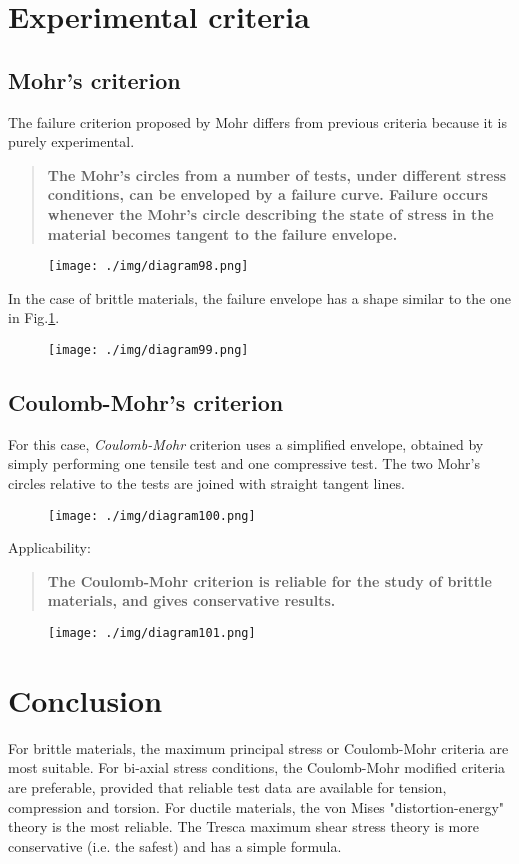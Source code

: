 \section{Experimental criteria}
\subsection{Mohr's criterion}
The failure criterion proposed by Mohr differs from previous criteria because it is purely experimental.
\begin{quotation}
  \textbf{The Mohr's circles from a number of tests, under different stress conditions, can be enveloped by a failure curve. Failure occurs whenever the Mohr's circle describing the state of stress in the material becomes tangent to the failure envelope.}
\end{quotation}
\begin{figure}[H]
  \centering
  \texttt{[image: ./img/diagram98.png]}
  \caption{}
\end{figure}
In the case of brittle materials, the failure envelope has a shape similar to the one in Fig.\ref{mohrscriterion1}.
\begin{figure}[H]
  \centering
  \texttt{[image: ./img/diagram99.png]}
  \caption{}
  \label{mohrscriterion1}
\end{figure}
\subsection{Coulomb-Mohr's criterion}
For this case, \textit{Coulomb-Mohr} criterion uses a simplified envelope, obtained by simply performing one tensile test and one compressive test. The two Mohr's circles relative to the tests are joined with straight tangent lines.
\begin{figure}[H]
  \centering
  \texttt{[image: ./img/diagram100.png]}
  \caption{}
\end{figure}
Applicability:
\begin{quotation}
  \textbf{The Coulomb-Mohr criterion is reliable for the study of brittle materials, and gives conservative results.}
\end{quotation}
\begin{figure}[H]
  \centering
  \texttt{[image: ./img/diagram101.png]}
  \caption{}
\end{figure}
\section{Conclusion}
For brittle materials, the maximum principal stress or Coulomb-Mohr criteria are most suitable. For bi-axial stress conditions, the Coulomb-Mohr modified criteria are preferable, provided that reliable test data are available for tension, compression and torsion. For ductile materials, the von Mises "distortion-energy" theory is the most reliable. The Tresca maximum shear stress theory is more conservative (i.e. the safest) and has a simple formula.